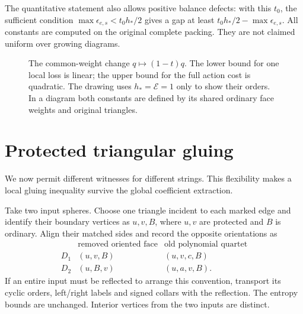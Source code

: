 \documentclass[11pt]{article}
\numberwithin{equation}{section}
\theoremstyle{definition}\newtheorem{definition}[theorem]{Definition}
\theoremstyle{remark}\newtheorem{remark}[theorem]{Remark}
\begin{document}
The quantitative statement also allows positive balance defects:
with this \(t_0\), the sufficient condition
\(\max\epsilon_{e,s}<t_0h_*/2\) gives a gap at least
\(t_0h_*/2-\max\epsilon_{e,s}\).
All constants are computed on the original complete packing.
They are not claimed uniform over growing diagrams.

\begin{figure}[ht]
\centering

\caption{The common-weight change \(q\mapsto(1-t)q\). The lower bound
for one local loss is linear; the upper bound for the full action
cost is quadratic. The drawing uses \(h_*=\mathcal E=1\) only to
show their orders. In a diagram both constants are defined by its
shared ordinary face weights and original triangles.}
\label{pc:gain-figure}
\end{figure}

\section{Protected triangular gluing}\label{pc:joining}

We now permit different witnesses for different strings. This
flexibility makes a local gluing inequality survive the global
coefficient extraction.

Take two input spheres. Choose one triangle incident to each marked
edge and identify their boundary vertices as \(u,v,B\), where
\(u,v\) are protected and \(B\) is ordinary. Align their matched
sides and record the opposite orientations as
\begin{equation}\label{pc:old-pairs}
\begin{array}{c|c|c}
 &\text{removed oriented face}&\text{old polynomial quartet}\\ \hline
 D_1&(u,v,B)&(u,v,c,B)\\
 D_2&(u,B,v)&(u,a,v,B).
\end{array}
\end{equation}
If an entire input must be reflected to arrange this convention,
transport its cyclic orders, left/right labels and signed collars
with the reflection. The entropy bounds are unchanged.
Interior vertices from the two inputs are distinct.
\end{document}
